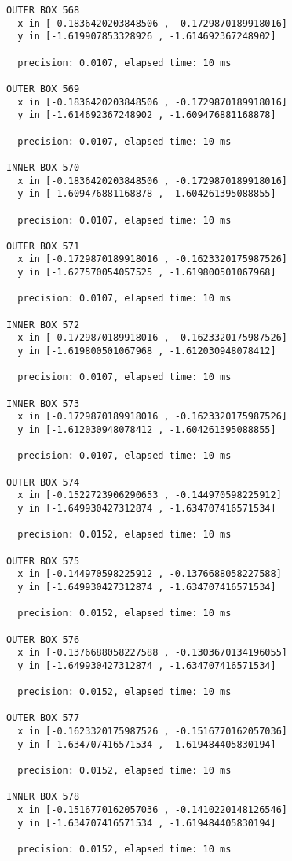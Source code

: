 \begin{verbatim}
OUTER BOX 568
  x in [-0.1836420203848506 , -0.1729870189918016]
  y in [-1.619907853328926 , -1.614692367248902]

  precision: 0.0107, elapsed time: 10 ms

OUTER BOX 569
  x in [-0.1836420203848506 , -0.1729870189918016]
  y in [-1.614692367248902 , -1.609476881168878]

  precision: 0.0107, elapsed time: 10 ms

INNER BOX 570
  x in [-0.1836420203848506 , -0.1729870189918016]
  y in [-1.609476881168878 , -1.604261395088855]

  precision: 0.0107, elapsed time: 10 ms

OUTER BOX 571
  x in [-0.1729870189918016 , -0.1623320175987526]
  y in [-1.627570054057525 , -1.619800501067968]

  precision: 0.0107, elapsed time: 10 ms

INNER BOX 572
  x in [-0.1729870189918016 , -0.1623320175987526]
  y in [-1.619800501067968 , -1.612030948078412]

  precision: 0.0107, elapsed time: 10 ms

INNER BOX 573
  x in [-0.1729870189918016 , -0.1623320175987526]
  y in [-1.612030948078412 , -1.604261395088855]

  precision: 0.0107, elapsed time: 10 ms

OUTER BOX 574
  x in [-0.1522723906290653 , -0.144970598225912]
  y in [-1.649930427312874 , -1.634707416571534]

  precision: 0.0152, elapsed time: 10 ms

OUTER BOX 575
  x in [-0.144970598225912 , -0.1376688058227588]
  y in [-1.649930427312874 , -1.634707416571534]

  precision: 0.0152, elapsed time: 10 ms

OUTER BOX 576
  x in [-0.1376688058227588 , -0.1303670134196055]
  y in [-1.649930427312874 , -1.634707416571534]

  precision: 0.0152, elapsed time: 10 ms

OUTER BOX 577
  x in [-0.1623320175987526 , -0.1516770162057036]
  y in [-1.634707416571534 , -1.619484405830194]

  precision: 0.0152, elapsed time: 10 ms

INNER BOX 578
  x in [-0.1516770162057036 , -0.1410220148126546]
  y in [-1.634707416571534 , -1.619484405830194]

  precision: 0.0152, elapsed time: 10 ms


\end{verbatim}
